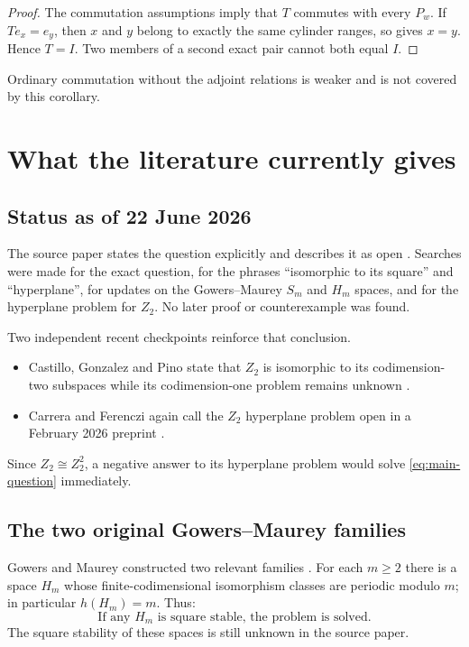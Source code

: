 \documentclass[11pt]{article}
\theoremstyle{definition}
\theoremstyle{remark}
\begin{document}
\begin{proof}
The commutation assumptions imply that $T$ commutes with every $P_w$.  If
$Te_x=e_y$, then $x$ and $y$ belong to exactly the same cylinder ranges, so
 gives $x=y$.  Hence $T=I$.  Two members of a second exact
pair cannot both equal $I$.
\end{proof}

Ordinary commutation without the adjoint relations is weaker and is not covered
by this corollary.

\section{What the literature currently gives}

\subsection{Status as of 22 June 2026}

The source paper states the question explicitly and describes it as open
\cite[Question 2.15]{AlbiacAnsorena2026}.  Searches were made for the exact
question, for the phrases ``isomorphic to its square'' and ``hyperplane'', for
updates on the Gowers--Maurey $S_m$ and $H_m$ spaces, and for the hyperplane
problem for $Z_2$.  No later proof or counterexample was found.

Two independent recent checkpoints reinforce that conclusion.
\begin{itemize}[leftmargin=1.6em]
\item Castillo, Gonzalez and Pino state that $Z_2$ is isomorphic to its
codimension-two subspaces while its codimension-one problem remains unknown
\cite{CastilloGonzalezPino2025}.
\item Carrera and Ferenczi again call the $Z_2$ hyperplane problem open in a
February 2026 preprint \cite{CarreraFerenczi2026}.
\end{itemize}
Since $Z_2\cong Z_2^2$, a negative answer to its hyperplane problem would solve
\eqref{eq:main-question} immediately.

\subsection{The two original Gowers--Maurey families}

Gowers and Maurey constructed two relevant families \cite{GowersMaurey1997}.
For each $m\ge2$ there is a space $H_m$ whose finite-codimensional isomorphism
classes are periodic modulo $m$; in particular $h(H_m)=m$.  Thus:
\[
 \boxed{\text{If any }H_m\text{ is square stable, the problem is solved.}}
\]
The square stability of these spaces is still unknown in the source paper.
\end{document}
